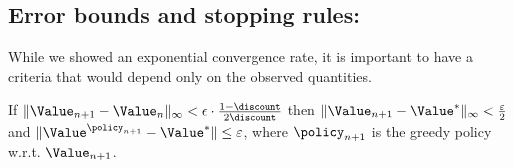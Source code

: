 \subsection{Error bounds and stopping rules:}

While we showed an exponential convergence rate, it is important to
have a criteria that would depend only on the observed quantities.
\begin{lemma}
 If $\|\Value_{n+1}-\Value_{n}\|_\infty < \epsilon \cdot \frac{1-\discount}{2\discount}$ then $\|\Value_{n+1} -
\Value^{*}\|_\infty < \frac{\varepsilon}{2}$ and
$\|\Value^{\policy_{n+1}}-\Value^*\|\leq \varepsilon$, where
$\policy_{n+1}$ is the greedy policy w.r.t. $\Value_{n+1}$.
\end{lemma}
